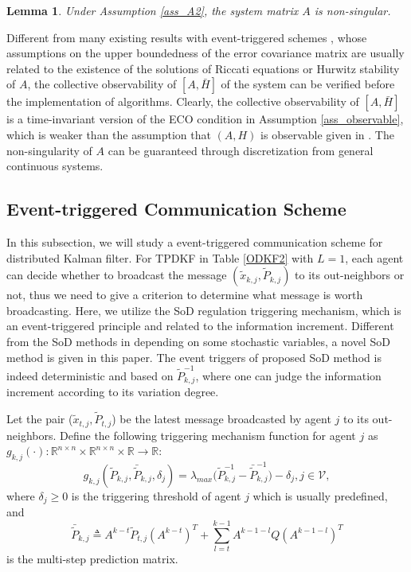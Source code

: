 \documentclass[journal,transmag]{IEEEtran}
\newtheorem{lemma}{\textbf{Lemma}}
\begin{document}
{	\begin{lemma}
		Under Assumption  \ref{ass_A2}, the system matrix $A$ is non-singular.	
	\end{lemma}
	
	Different from many existing results with event-triggered schemes \cite{liu2015event}, {whose  assumptions on the upper boundedness of the error covariance matrix  are usually  related to the existence of the solutions of Riccati equations or Hurwitz stability of $A$,}
	the collective observability of $[A,\bar H]$ of the system can be verified before the implementation of algorithms.
	Clearly, the collective observability of $[A,\bar H]$ is a time-invariant version of the ECO condition in Assumption \ref{ass_observable}, which is weaker than the assumption that $(A,H)$ is observable given in \cite{Battistelli2014Kullback,Battistelli2016Distributed,Battistelli2015Consensus}.  The non-singularity of $A$ can be guaranteed through discretization from general continuous systems.
	
	\subsection{Event-triggered Communication Scheme}
	In this subsection, we will study a event-triggered communication scheme for distributed Kalman filter.
	{For  TPDKF in Table \ref{ODKF2} with $L=1$, each agent can decide whether to broadcast the message $(\tilde x_{k,j},\tilde P_{k,j})$ to its out-neighbors or not, thus we need to give a criterion to determine what message is worth broadcasting.}
	Here, we utilize the SoD regulation triggering mechanism, which is an event-triggered principle and related to the information increment.
	Different from the SoD methods in \cite{liu2015event,andren2016event} depending on some stochastic variables, a novel  SoD method
	is given in this paper. The event triggers of proposed SoD method is indeed deterministic and  based on $\tilde P_{k,j}^{-1}$, where one can judge the information increment according to its variation degree.

	
	
	
	Let the pair ($\tilde x_{t,j},\tilde P_{t,j}$) be the latest  message broadcasted by agent $j$ to its out-neighbors.
	Define the following triggering mechanism function for agent $j$ as $g_{k,j}(\cdot):\mathbb{R}^{n\times n}\times \mathbb{R}^{n\times n}\times \mathbb{R}\rightarrow \mathbb{R}$:
	\begin{equation}\label{triggering}
	g_{k,j}(\tilde P_{k,j},\bar{\tilde{P}}_{k,j},\delta_{j})=\lambda_{max}\big(\tilde P_{k,j}^{-1}-\bar{\tilde{P}}_{k,j}^{-1}\big)-\delta_{j},j\in\mathcal{V},
	\end{equation}
	where  $\delta_{j}\geq0$ is the triggering threshold of agent $j$ which is usually predefined, and
	\begin{equation}\label{eq_pred_matrix}
	\bar{\tilde{P}}_{k,j}\triangleq A^{k-t}\tilde P_{t,j} (A^{k-t})^T+\sum_{l=t}^{k-1} A^{k-1-l}Q(A^{k-1-l})^T
	\end{equation}
	is the multi-step prediction matrix.
	
}
\end{document}
